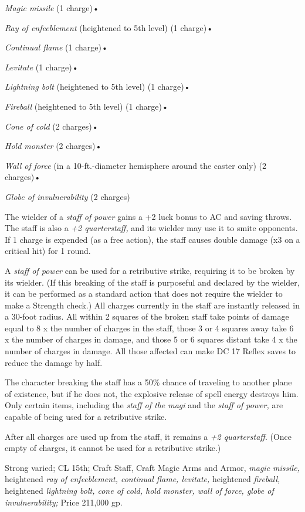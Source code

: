 \textit{Magic missile }(1 charge)•

\textit{Ray of enfeeblement }(heightened to 5th level) (1 charge)•

\textit{Continual flame }(1 charge)•

\textit{Levitate }(1 charge)•

\textit{Lightning bolt }(heightened to 5th level) (1 charge)•

\textit{Fireball }(heightened to 5th level) (1 charge)•

\textit{Cone of cold }(2 charges)•

\textit{Hold monster }(2 charges)•

\textit{Wall of force }(in a 10-ft.-diameter hemisphere around the caster only) 
(2 charges)•

\textit{Globe of invulnerability }(2 charges)

The wielder of a \textit{staff of power }gains a +2 luck bonus to AC and saving 
throws. The staff is also a \textit{+2 quarterstaff, }and its wielder may use it 
to smite opponents. If 1 charge is expended (as a free action), the staff causes 
double damage (x3 on a critical hit) for 1 round.

A \textit{staff of power }can be used for a retributive strike, requiring it to 
be broken by its wielder. (If this breaking of the staff is purposeful and declared 
by the wielder, it can be performed as a standard action that does not require 
the wielder to make a Strength check.) All charges currently in the staff are instantly 
released in a 30-foot radius. All within 2 squares of the broken staff take points 
of damage equal to 8 x the number of charges in the staff, those 3 or 4 squares 
away take 6 x the number of charges in damage, and those 5 or 6 squares distant 
take 4 x the number of charges in damage. All those affected can make DC 17 Reflex 
saves to reduce the damage by half.

The character breaking the staff has a 50\% chance of traveling to another plane 
of existence, but if he does not, the explosive release of spell energy destroys 
him. Only certain items, including the \textit{staff of the magi} and the \textit{staff 
of power, }are capable of being used for a retributive strike.

After all charges are used up from the staff, it remains a \textit{+2 quarterstaff}. 
(Once empty of charges, it cannot be used for a retributive strike.)

Strong varied; CL 15th; Craft Staff, Craft Magic Arms and Armor, \textit{magic 
missile, }heightened \textit{ray of enfeeblement, continual flame, levitate, }heightened 
\textit{fireball, }heightened \textit{lightning bolt, cone of cold, hold monster, 
wall of force, globe of invulnerability; }Price 211,000 gp.


